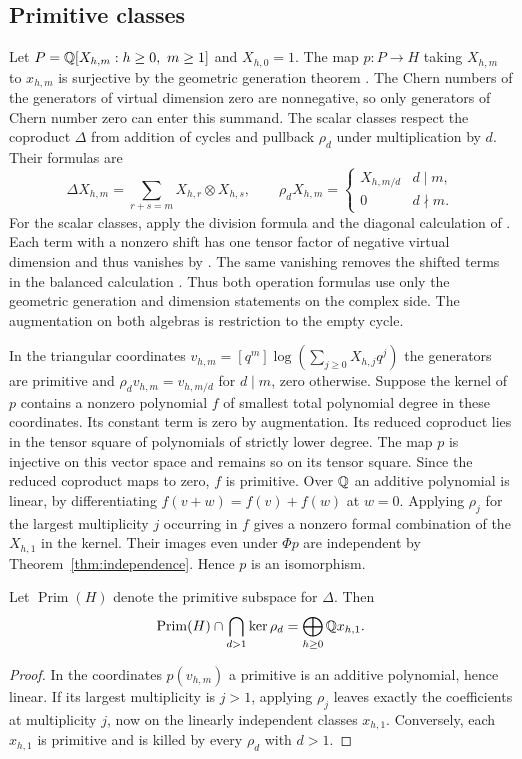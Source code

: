 \subsection{Primitive classes}
Let $P=\mathbb Q[X_{h,m}:h\ge0,\ m\ge1]$ and $X_{h,0}=1$. The map
$p:P\to H$ taking $X_{h,m}$ to $x_{h,m}$ is surjective by the
geometric generation theorem \cite[Theorem~6.13]{Pardon}.
The Chern numbers of the generators of virtual dimension zero are
nonnegative, so only generators of Chern number zero can enter
this summand. The scalar classes respect the coproduct $\Delta$ from
addition of cycles and pullback $\rho_d$ under multiplication by $d$.
Their formulas are
\[
 \Delta X_{h,m}=\sum_{r+s=m}X_{h,r}\otimes X_{h,s},
 \qquad
 \rho_d X_{h,m}=
 \begin{cases}X_{h,m/d}& d\mid m,\\ 0& d\nmid m.\end{cases}
\]
For the scalar classes, apply the division formula and the diagonal
calculation of \cite[\S4, in particular Lemma~4.13]{Pardon}. Each term
with a nonzero shift has one tensor factor of negative virtual dimension
and thus vanishes by \cite[Theorem~6.13]{Pardon}. The same vanishing
removes the shifted terms in the balanced calculation
\cite[\S3]{PaperIII}. Thus both operation formulas use only the
geometric generation and dimension statements on the complex side. The augmentation on both algebras is
restriction to the empty cycle.

In the triangular coordinates
$v_{h,m}=[q^m]\log(\sum_{j\ge0}X_{h,j}q^j)$ the generators are
primitive and $\rho_d v_{h,m}=v_{h,m/d}$ for $d\mid m$, zero otherwise.
Suppose the kernel of $p$ contains a nonzero polynomial $f$ of smallest
total polynomial degree in these coordinates. Its constant term is zero
by augmentation. Its reduced coproduct lies in the tensor square of
polynomials of strictly lower degree. The map $p$ is injective on
this vector space and remains so on its tensor square. Since the
reduced coproduct maps to zero, $f$ is primitive. Over $\mathbb Q$ an
additive polynomial is linear, by differentiating $f(v+w)=f(v)+f(w)$
at $w=0$. Applying $\rho_j$ for the largest multiplicity $j$ occurring
in $f$ gives a nonzero formal combination of the $X_{h,1}$ in the
kernel. Their images even under $\Phi p$ are independent by
Theorem~\ref{thm:independence}. Hence $p$ is an isomorphism.

\begin{lemma}\label{lem:primitive-division}
Let $\operatorname{Prim}(H)$ denote the primitive subspace for $\Delta$.
Then
\[
  \operatorname{Prim}(H)\cap\bigcap_{d>1}\ker\rho_d
      =\bigoplus_{h\ge0}\mathbb Q x_{h,1}.
\]
\end{lemma}
\begin{proof}
In the coordinates $p(v_{h,m})$ a primitive is an additive polynomial,
hence linear. If its largest multiplicity is $j>1$, applying $\rho_j$
leaves exactly the coefficients at multiplicity $j$, now on the
linearly independent classes $x_{h,1}$. Conversely, each $x_{h,1}$
is primitive and is killed by every $\rho_d$ with $d>1$.
\end{proof}

